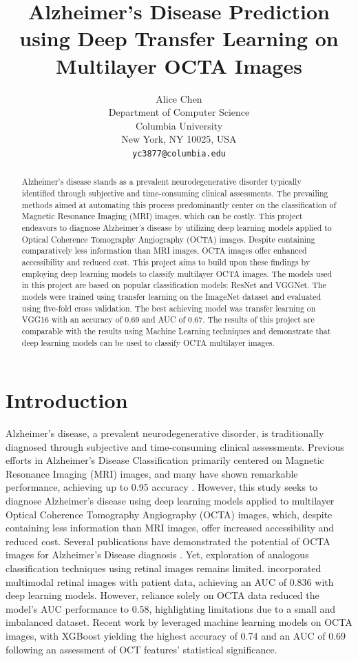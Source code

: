 \documentclass{article} %
\title{Alzheimer's Disease Prediction using Deep Transfer Learning on Multilayer OCTA Images}
\author{Alice Chen\\
Department of Computer Science\\
Columbia University\\
New York, NY 10025, USA \\
\texttt{yc3877@columbia.edu} \\
}
\begin{document}
\maketitle

\begin{abstract}
Alzheimer's disease stands as a prevalent neurodegenerative disorder typically identified through subjective and time-consuming clinical assessments. The prevailing methods aimed at automating this process predominantly center on the classification of Magnetic Resonance Imaging (MRI) images, which can be costly. This project endeavors to diagnose Alzheimer's disease by utilizing deep learning models applied to Optical Coherence Tomography Angiography (OCTA) images. Despite containing comparatively less information than MRI images, OCTA images offer enhanced accessibility and reduced cost. This project aims to build upon these findings by employing deep learning models to classify multilayer OCTA images. The models used in this project are based on popular classification models: ResNet and VGGNet. The models were trained using transfer learning on the ImageNet dataset and evaluated using five-fold cross validation. The best achieving model was transfer learning on VGG16 with an accuracy of 0.69 and AUC of 0.67. The results of this project are comparable with the results using Machine Learning techniques and demonstrate that deep learning models can be used to classify OCTA multilayer images.
\end{abstract}

\section{Introduction}
Alzheimer's disease, a prevalent neurodegenerative disorder, is traditionally diagnosed through subjective and time-consuming clinical assessments. Previous efforts in Alzheimer's Disease Classification primarily centered on Magnetic Resonance Imaging (MRI) images, and many have shown remarkable performance, achieving up to 0.95 accuracy \citep{yang2018visual, singh20203d}. However, this study seeks to diagnose Alzheimer's disease using deep learning models applied to multilayer Optical Coherence Tomography Angiography (OCTA) images, which, despite containing less information than MRI images, offer increased accessibility and reduced cost. Several publications have demonstrated the potential of OCTA images for Alzheimer's Disease diagnosis \citet{turkan2022survey}. Yet, exploration of analogous classification techniques using retinal images remains limited. \citet{WISELY2024100355} incorporated multimodal retinal images with patient data, achieving an AUC of 0.836 with deep learning models. However, reliance solely on OCTA data reduced the model's AUC performance to 0.58, highlighting limitations due to a small and imbalanced dataset. Recent work by \citet{https://doi.org/10.1111/cns.13963} leveraged machine learning models on OCTA images, with XGBoost yielding the highest accuracy of 0.74 and an AUC of 0.69 following an assessment of OCT features' statistical significance.
\end{document}

